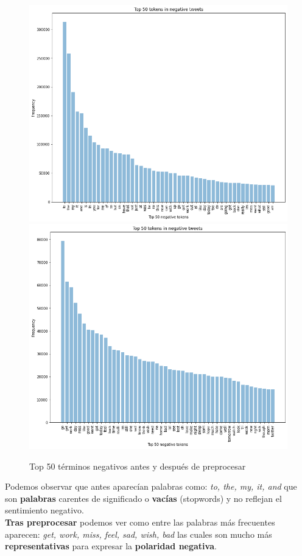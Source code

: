 \documentclass[a4paper,12pt]{report}
\begin{document}
\begin{figure}[htbp!]
\begin{center}
\includegraphics[scale=0.3]{images/neg.png}
\includegraphics[scale=0.3]{images/neg_clean.png}
\end{center}
\caption{Top 50 términos negativos antes y después de preprocesar}
\end{figure}

{\setlength{\parindent}{0cm}
Podemos observar que antes aparecían palabras como: \textit{to, the, my, it, and} que son \textbf{palabras } carentes de significado o \textbf{vacías} (stopwords) y no reflejan el sentimiento negativo. }
\vspace{2mm}\\
\textbf{Tras preprocesar} podemos ver como entre las palabras más frecuentes aparecen: \textit{get, work, miss, feel, sad, wish, bad} las cuales son mucho más \textbf{representativas} para expresar la \textbf{polaridad negativa}.
\end{document}
